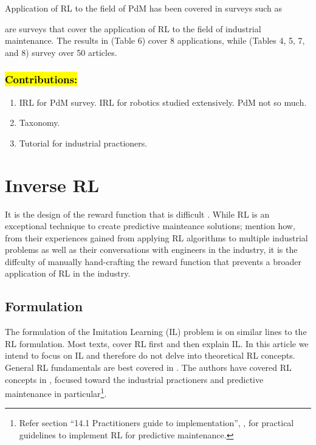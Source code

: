 \documentclass{article}
\newcommand{\hlc}[2][blue!10]{{\colorlet{foo}{#1} \sethlcolor{foo}\hl{#2}}}
\begin{document}
	Application of RL to the field of PdM has been covered in surveys such as \cite{Erhan2021Smart, Ren2021, Barja-Martinez2021, panzer2022, siraskar2023}
	
	\cite{panzer2022, siraskar2023} are surveys that cover the application of RL to the field of industrial maintenance. The results in \cite{panzer2022} (Table 6) cover 8 applications, while \cite{siraskar2023} (Tables 4, 5, 7, and 8) survey over 50 articles.
	
	\subsubsection*{\hlc{Contributions:}}
	\begin{enumerate}
		\item IRL for PdM survey. IRL for robotics studied extensively. PdM not so much.
		\item Taxonomy.
		\item Tutorial for industrial practioners.
	\end{enumerate}
	
	\section{Inverse RL}
	
	It is the design of the reward function that is difficult \citep{abbeel2004apprenticeship, ng2000algorithms}.
	While RL is an exceptional technique to create predictive mainteance solutions; \cite{abbeel2004apprenticeship} mention how, from their experiences gained from applying RL algorithms to multiple industrial problems as well as their conversations with engineers in the industry, it is the diffculty of manually hand-crafting the reward function that prevents a broader application of RL in the industry.
	
	\subsection{Formulation} 
	
	The formulation of the Imitation Learning (IL) problem is on similar lines to the RL formulation. Most texts, cover RL first and then explain IL. In this article we intend to focus on IL and therefore do not delve into theoretical RL concepts. General RL fundamentals are best covered in \citep{sutton2018, stanford-lectures}. The authors have covered RL concepts in \cite{siraskar2023}, focused toward the industrial practioners and predictive maintenance in particular\footnote{Refer section ``14.1 Practitioners guide to implementation'', \citep{siraskar2023}, for practical guidelines to implement RL for predictive maintenance.}.  
	
\end{document}

